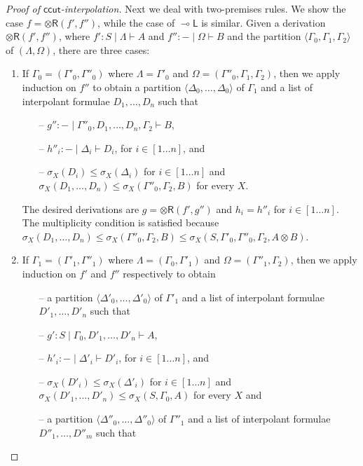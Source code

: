 \documentclass[sn-mathphys-num]{sn-jnl}%
\newcommand{\GG}{\Gamma}
\newcommand{\GD}{\Delta}
\newcommand{\GL}{\Lambda}
\newcommand{\GO}{\Omega}
\newcommand{\vd}{\vdash}
\newcommand{\tr}{\otimes\mathsf{R}}
\newcommand{\ot}{\otimes}
\newcommand{\lolli}{\multimap}
\newcommand{\lleft}{{\lolli}\mathsf{L}}
\newcommand{\mf}[1]{\mathsf{#1}}
\newcommand{\gs}[1]{\sigma_{X} (#1)}
\theoremstyle{thmstyleone}%
\theoremstyle{thmstyletwo}%
\theoremstyle{thmstylethree}%
\begin{document}
\begin{proof}[Proof of $\mf{ccut}$-interpolation]
Next we deal with two-premises rules.
We show the case $f = \tr (f' , f'')$, while the case of $\lleft$ is similar.
Given a derivation $\tr (f' , f'')$, where $f' : S \mid \GL \vd A$ and $f'' : {-} \mid \GO \vd B$ and the partition $\langle \GG_0 , \GG_1, \GG_2 \rangle$ of $(\GL, \GO)$, there are three cases:
\begin{enumerate}
  \item If $\GG_0 = (\GG'_0 , \GG''_0)$ where $\GL = \GG'_0$ and $\GO = (\GG''_0 , \GG_1 , \GG_2)$, then we apply induction on $f''$ to obtain a partition $\langle \GD_0, \dots , \GD_0 \rangle$ of $\GG_1$ and a list of interpolant formulae $D_1, \dots , D_n$ such that
  \begin{itemize}
    \item[--] $g'' : {-} \mid \GG''_0 , D_1 , \dots , D_n , \GG_2 \vd B$,
    \item[--] $h''_i : {-} \mid \GD_i \vd D_i$, for $i \in [1 \dots n]$, and 
    \item[--] $\gs{D_i} \leq \gs{\GD_i}$ for $i \in [1 \dots n]$ and $\gs{D_1, \dots , D_n} \leq \gs{ \GG''_0 , \GG_2 , B}$ for every $X$.
  \end{itemize}
  The desired derivations are $g = \tr (f' , g'')$ and $h_i = h''_i$ for $i \in [1 \dots n]$.
  The multiplicity condition is satisfied because $\gs{D_1 , \dots , D_n} \leq \gs{ \GG''_0 , \GG_2 , B} \leq \gs{S, \GG'_0, \GG''_0 , \GG_2 , A \ot B}$.
  \item If $\GG_1 = (\GG'_1 , \GG''_1)$ where $\GL = (\GG_0 , \GG'_1)$ and $\GO = (\GG''_1 , \GG_2)$, then we apply induction on $f'$ and $f''$ respectively to obtain
  \begin{itemize}
    \item[--] a partition $\langle \GD'_0, \dots , \GD'_0 \rangle$ of $\GG'_1$ and a list of interpolant formulae $D'_1, \dots , D'_n$ such that
    \item[--] $g' : S \mid \GG_0 , D'_1 , \dots , D'_n \vd A$,
    \item[--] $h'_i : {-} \mid \GD'_i \vd D'_i$, for $i \in [1 \dots n]$, and 
    \item[--] $\gs{D'_i} \leq \gs{\GD'_i}$ for $i \in [1 \dots n]$ and $\gs{D'_1 , \dots , D'_n} \leq \gs{ S, \GG_0 , A}$ for every $X$ and
  \end{itemize}
  \begin{itemize}
    \item[--] a partition $\langle \GD''_0, \dots , \GD''_0 \rangle$ of $\GG''_1$ and a list of interpolant formulae $D''_1, \dots , D''_m$ such that

\end{itemize}
\end{enumerate}
\end{proof}
\end{document}
